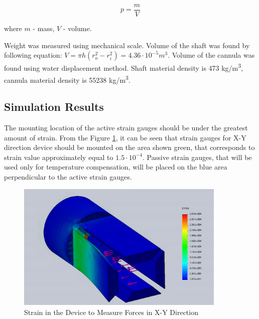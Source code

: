 \begin{equation}
p=\frac{m}{V}
\end{equation}

where $m$ - mass, $V$ - volume.

Weight was measured using mechanical scale. Volume of the shaft was found by following equation: $V =  \pi h(r_o^2-r_i^2) = 4.36 \cdot 10^{-5} m^3$. Volume of the cannula was found using water displacement method. Shaft material density is 473 kg/m\textsuperscript{3}, cannula material density is 55238 kg/m\textsuperscript{3}.

\subsection{Simulation Results}
\label{sec:FEAres}
The mounting location of the active strain gauges should be under the greatest amount of strain. From the Figure \ref{fig:XYdev}, it can be seen that strain gauges for X-Y direction device should be mounted on the area shown green, that corresponds to strain value approximately equal to $1.5 \cdot 10^{-4}$. Passive strain gauges, that will be used only for temperature compensation, will be placed on the blue area perpendicular to the active strain gauges.

\begin{figure}[h]
	\begin{center}
		\includegraphics[width=100mm]{fig/methods/old_sleeve.png}
	\end{center}
	\vspace{-4mm}
	\caption[Strain in the Device to Measure Forces in X-Y Direction]
	{Strain in the Device to Measure Forces in X-Y Direction}
	\label{fig:XYdev}
	\vspace{-2mm}
\end{figure}


